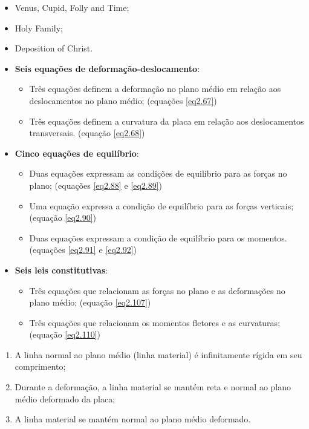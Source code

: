 		\begin{itemize}
			\item{Venus, Cupid, Folly and Time;}
			\item{Holy Family;}
			\item{Deposition of Christ.}
		\end{itemize}
		\begin{itemize}
			\item{\textbf{Seis equações de deformação-deslocamento}:}
			\begin{itemize}
				\item{Três equações definem a deformação no plano médio em relação aos deslocamentos no plano médio; (equações \ref{eq2.67})}
				\item{Três equações definem a curvatura da placa em relação aos deslocamentos transversais. (equação \ref{eq2.68})}
			\end{itemize}

			\item{\textbf{Cinco equações de equilíbrio}:}
			\begin{itemize}
				\item{Duas equações expressam as condições de equilíbrio para as forças no plano; (equações \ref{eq2.88} e \ref{eq2.89})}
				\item{Uma equação expressa a condição de equilíbrio para as forças verticais; (equação \ref{eq2.90})}
				\item{Duas equações expressam a condição de equilíbrio para os momentos. (equações \ref{eq2.91} e \ref{eq2.92})}
			\end{itemize}

			\item{\textbf{Seis leis constitutivas}:}
			\begin{itemize}
				\item{Três equações que relacionam as forças no plano e as deformações no plano médio; (equação \ref{eq2.107})}
				\item{Três equações que relacionam os momentos fletores e as curvaturas; (equação \ref{eq2.110})}
			\end{itemize}
		\end{itemize}
		\begin{enumerate}
			\item{\label{item1} A linha normal ao plano médio (linha material) é infinitamente rígida em seu comprimento;}
			\item{\label{item2} Durante a deformação, a linha material se mantém reta e normal ao plano médio deformado da placa;}
			\item{\label{item3} A linha material se mantém normal ao plano médio deformado.}
		\end{enumerate}
          
